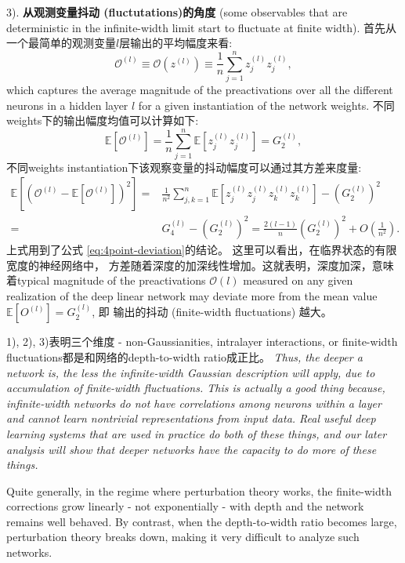 3). \textbf{从观测变量抖动 (fluctutations)的角度} (some observables that are 
deterministic in the infinite-width limit start to fluctuate at finite width).
首先从一个最简单的观测变量$l$层输出的平均幅度来看:
\begin{equation}
    \mathcal{O}^{(l)} \equiv \mathcal{O}(z^{(l)}) \equiv 
        \frac{1}{n} \sum_{j=1}^n z_j^{(l)}z_j^{(l)},
\end{equation}
which captures the average magnitude of the preactivations over all the different
neurons in a hidden layer $l$ for a given instantiation of the network weights.
不同weights下的输出幅度均值可以计算如下:
\begin{equation*}
    \mathbb{E}\left[\mathcal{O}^{(l)}\right] = 
        \frac{1}{n}\sum_{j=1}^n \mathbb{E}[z_j^{(l)}z_j^{(l)}] = G_2^{(l)},
\end{equation*}
不同weights instantiation下该观察变量的抖动幅度可以通过其方差来度量:
\begin{equation}
    \begin{aligned}
        \mathbb{E}\left[\left(\mathcal{O}^{(l)} - \mathbb{E}\left[
            \mathcal{O}^{(l)} \right]\right)^2\right]
        =& \frac{1}{n^2} \sum_{j,k=1}^n 
            \mathbb{E}\left[z_j^{(l)}z_j^{(l)}z_k^{(l)}z_k^{(l)}\right]
            - \left(G_2^{(l)}\right)^2 \\
        =& G_4^{(l)} - \left(G_2^{(l)}\right)^2 
        = \frac{2(l-1)}{n}\left(G_2^{(l)}\right)^2 + O\left(\frac{1}{n^2}\right).
    \end{aligned}
\end{equation}
上式用到了公式 \ref{eq:4point-deviation}的结论。 这里可以看出，在临界状态的有限宽度的神经网络中，
方差随着深度的加深线性增加。这就表明，深度加深，意味着typical magnitude of the preactivations 
$\mathcal{O}(l)$ measured on any given realization of the deep linear network may 
deviate more from the mean value $\mathbb{E}\left[O^{(l)}\right] = G_2^{(l)}$, 即
输出的抖动 (finite-width fluctuations) 越大。

1), 2), 3)表明三个维度 - non-Gaussianities, intralayer interactions, or finite-width 
fluctuations都是和网络的depth-to-width ratio成正比。 \emph{Thus, the deeper a network is, 
the less the infinite-width Gaussian description will apply, due to accumulation of 
finite-width fluctuations. This is actually a good thing because, infinite-width 
networks do not have correlations among neurons within a layer and cannot learn 
nontrivial representations from input data. Real useful deep learning systems 
that are used in practice do both of these things, and our later analysis will 
show that deeper networks have the capacity to do more of these things.}

Quite generally, in the regime where perturbation theory works, the finite-width 
corrections grow linearly - not exponentially - with depth and the network 
remains well behaved. By contrast, when the depth-to-width ratio becomes large, 
perturbation theory breaks down, making it very difficult to analyze such networks.